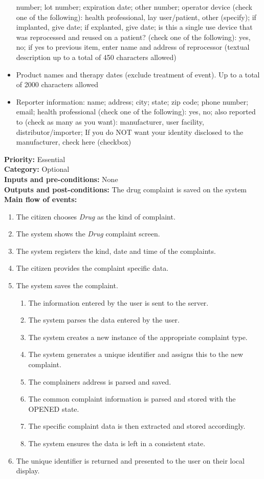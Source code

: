 \documentclass[11pt,twoside]{article}
\begin{document}
\begin{itemize}
number; lot number; expiration date; other number; operator device (check one of the following): health professional, lay user/patient,
other (specify); if implanted, give date; if explanted, give date; is this a single use device that was reprocessed and reused on a
patient? (check one of the following): yes, no; if yes to previous item, enter name and address of reprocessor (textual description up to a
total of 450 characters allowed)
\item  Product names and therapy dates (exclude treatment of event). Up to a total of 2000 characters allowed 
\item Reporter information: name; address; city; state; zip code; phone number; email; health professional (check one of the following):
yes, no; also reported to (check as many as you want): manufacturer, user facility, distributor/importer;  If you do NOT want your identity
disclosed to the manufacturer, check here (checkbox)  
\end{itemize}
\textbf{Priority:} Essential \\ 
\textbf{Category:} Optional \\ 
\textbf{Inputs and pre-conditions:} None\\ 
\textbf{Outputs and post-conditions:}  The drug complaint is saved on the system\\  
\textbf{Main flow of events:}\\
\begin{enumerate}
\item The citizen chooses \textit{Drug} as the kind of complaint.
\item The system shows the \textit{Drug} complaint screen.
\item The system registers the kind, date and time of the complaints.
\item The citizen provides the complaint specific data.
\item The system saves the complaint.
\begin{enumerate}
\item The information entered by the user is sent to the server.
\item The system parses the data entered by the user.
\item The system creates a new instance of the appropriate complaint
type.
\item The system generates a unique identifier and assigns this to the new
complaint.
\item The complainers address is parsed and saved.
\item The common complaint information is parsed and stored with the
OPENED state.
\item The specific complaint data is then extracted and stored accordingly.
\item The system ensures the data is left in a consistent state.
\end{enumerate}
\item The unique identifier is returned and presented to the user on their local
display.
\end{enumerate}
\end{document}
